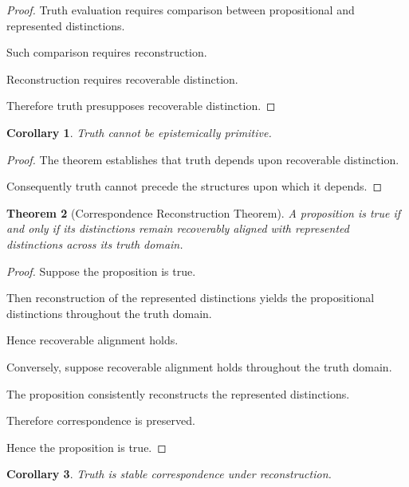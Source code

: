 \documentclass[12pt,oneside]{article}
\newtheorem{theorem}{Theorem}[section] \newtheorem{lemma}[theorem]{Lemma} \newtheorem{proposition}[theorem]{Proposition} \newtheorem{corollary}[theorem]{Corollary}
\theoremstyle{definition}
\begin{document}
\begin{proof}

Truth evaluation requires comparison between propositional and represented distinctions.

Such comparison requires reconstruction.

Reconstruction requires recoverable distinction.

Therefore truth presupposes recoverable distinction.

\end{proof}

\begin{corollary}

Truth cannot be epistemically primitive.

\end{corollary}

\begin{proof}

The theorem establishes that truth depends upon recoverable distinction.

Consequently truth cannot precede the structures upon which it depends.

\end{proof}

\begin{theorem}[Correspondence Reconstruction Theorem]

A proposition is true if and only if its distinctions remain recoverably aligned with represented distinctions across its truth domain.

\end{theorem}

\begin{proof}

Suppose the proposition is true.

Then reconstruction of the represented distinctions yields the propositional distinctions throughout the truth domain.

Hence recoverable alignment holds.

Conversely, suppose recoverable alignment holds throughout the truth domain.

The proposition consistently reconstructs the represented distinctions.

Therefore correspondence is preserved.

Hence the proposition is true.

\end{proof}

\begin{corollary}

Truth is stable correspondence under reconstruction.

\end{corollary}
\end{document}
